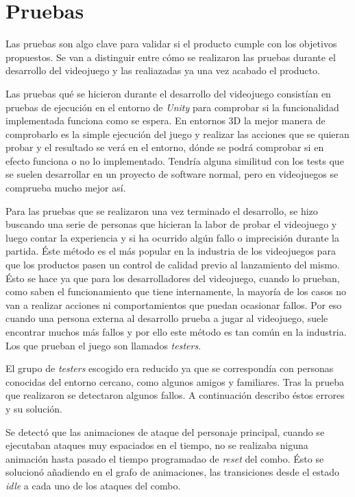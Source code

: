 \section{Pruebas}

Las pruebas son algo clave para validar si el producto cumple con los objetivos propuestos. Se van a distinguir entre cómo se realizaron las pruebas durante el desarrollo del videojuego y las realiazadas ya una vez acabado el producto.

Las pruebas qué se hicieron durante el desarrollo del videojuego consistían en pruebas de ejecución en el entorno de \textit{Unity} para comprobar si la funcionalidad implementada funciona como se espera. En entornos 3D la mejor manera de comprobarlo es la simple ejecución del juego y realizar las acciones que se quieran probar y el resultado se verá en el entorno, dónde se podrá comprobar si en efecto funciona o no lo implementado. Tendría alguna similitud con los tests que se suelen desarrollar en un proyecto de software normal, pero en videojuegos se comprueba mucho mejor así. 

Para las pruebas que se realizaron una vez terminado el desarrollo, se hizo buscando una serie de personas que hicieran la labor de probar el videojuego y luego contar la experiencia y si ha ocurrido algún fallo o imprecisión durante la partida. Éste método es el más popular en la industria de los videojuegos para que los productos pasen un control de calidad previo al lanzamiento del mismo. Ésto se hace ya que para los desarrolladores del videojuego, cuando lo prueban, como saben el funcionamiento que tiene internamente, la mayoría de los casos no van a realizar acciones ni comportamientos que puedan ocasionar fallos. Por eso cuando una persona externa al desarrollo prueba a jugar al videojuego, suele encontrar muchos más fallos y por ello este método es tan común en la industria. Los que prueban el juego son llamados \textit{testers}.

El grupo de \textit{testers} escogido era reducido ya que se correspondía con personas conocidas del entorno cercano, como algunos amigos y familiares. Tras la prueba que realizaron se detectaron algunos fallos. A continuación describo éstos errores y su solución.

Se detectó que las animaciones de ataque del personaje principal, cuando se ejecutaban ataques muy espaciados en el tiempo, no se realizaba niguna animación hasta pasado el tiempo programadao de \textit{reset} del combo. Ésto se solucionó añadiendo en el grafo de animaciones, las transiciones desde el estado \textit{idle} a cada uno de los ataques del combo.

